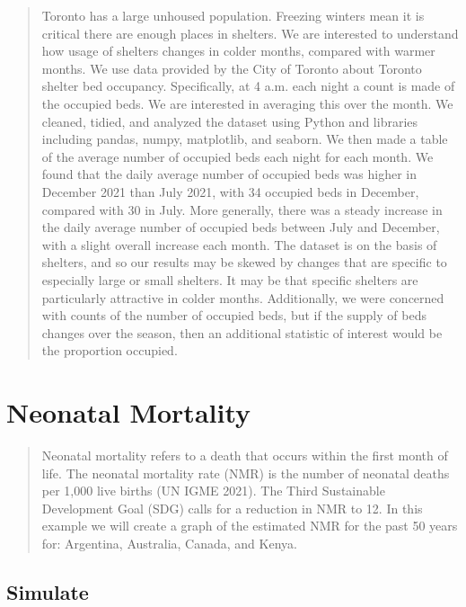 \documentclass[
  letterpaper,
  DIV=11,
  numbers=noendperiod]{scrreprt}
\begin{document}
\begin{quote}
Toronto has a large unhoused population. Freezing winters mean it is
critical there are enough places in shelters. We are interested to
understand how usage of shelters changes in colder months, compared with
warmer months. We use data provided by the City of Toronto about Toronto
shelter bed occupancy. Specifically, at 4 a.m. each night a count is
made of the occupied beds. We are interested in averaging this over the
month. We cleaned, tidied, and analyzed the dataset using Python and
libraries including pandas, numpy, matplotlib, and seaborn. We then made
a table of the average number of occupied beds each night for each
month. We found that the daily average number of occupied beds was
higher in December 2021 than July 2021, with 34 occupied beds in
December, compared with 30 in July. More generally, there was a steady
increase in the daily average number of occupied beds between July and
December, with a slight overall increase each month. The dataset is on
the basis of shelters, and so our results may be skewed by changes that
are specific to especially large or small shelters. It may be that
specific shelters are particularly attractive in colder months.
Additionally, we were concerned with counts of the number of occupied
beds, but if the supply of beds changes over the season, then an
additional statistic of interest would be the proportion occupied.
\end{quote}

\hypertarget{neonatal-mortality}{%
\section{Neonatal Mortality}\label{neonatal-mortality}}

\begin{quote}
Neonatal mortality refers to a death that occurs within the first month
of life. The neonatal mortality rate (NMR) is the number of neonatal
deaths per 1,000 live births (UN IGME 2021). The Third Sustainable
Development Goal (SDG) calls for a reduction in NMR to 12. In this
example we will create a graph of the estimated NMR for the past 50
years for: Argentina, Australia, Canada, and Kenya.
\end{quote}

\hypertarget{simulate-2}{%
\subsection{Simulate}\label{simulate-2}}
\end{document}

